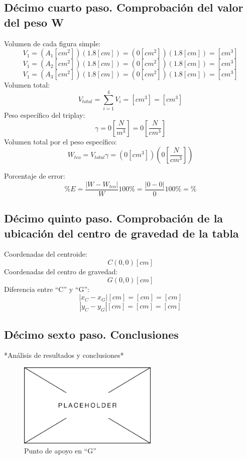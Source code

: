 \documentclass[12pt, titlepage]{report}
\begin{document}
    \subsection*{Décimo cuarto paso. Comprobación del valor del peso W}
    Volumen de cada figura simple:
    $$V_{1} = (A_{1} [cm^2])(1.8 [cm]) = (0 [cm^2])(1.8 [cm]) = [cm^3]$$
    $$V_{1} = (A_{2} [cm^2])(1.8 [cm]) = (0 [cm^2])(1.8 [cm]) = [cm^3]$$
    $$V_{1} = (A_{3} [cm^2])(1.8 [cm]) = (0 [cm^2])(1.8 [cm]) = [cm^3]$$
    Volumen total: 
    $$V_{total}=\sum_{i = 1}^{4} V_{i} = [cm^3] = [cm^3]$$
    Peso específico del triplay: 
    $$\gamma =0 [\frac{N}{m^3}] = 0 [\frac{N}{cm^3}]$$
    Volumen total por el peso específico: 
    $$W_{teo}=V_{total}\gamma = (0[cm^3])(0[\frac{N}{cm^3}])$$

    Porcentaje de error: $$\%E=\frac{|W-W_{teo}|}{W}100\%=\frac{|0-0|}{0}100\% = \%$$

    \subsection*{Décimo quinto paso. Comprobación de la ubicación del centro de gravedad de la tabla}
    Coordenadas del centroide: 
    $$C(0, 0)[cm]$$
    Coordenadas del centro de gravedad: 
    $$G(0, 0)[cm]$$ 
    Diferencia entre ``C'' y ``G'': 
    $$|x_{C}-x_{G}| [cm] = [cm] = [cm]$$
    $$|y_{C}-y_{G}| [cm] = [cm] = [cm]$$

    \subsection*{Décimo sexto paso. Conclusiones}
    *Análisis de resultados y conclusiones*
    
    \begin{figure}[ht]
        \centering
        \includegraphics[height=4cm]{Placeholder.png}
        \caption{Punto de apoyo en ``G''}
    \end{figure}
\end{document}
